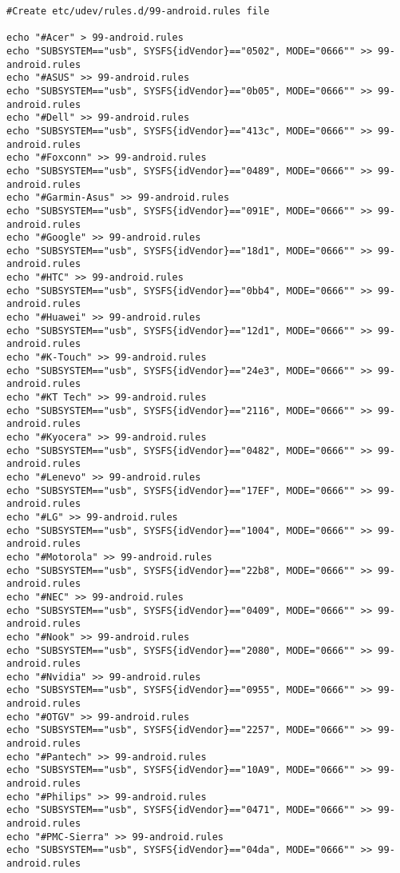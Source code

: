 \begin{maxipage}
\begin{verbatim}
#Create etc/udev/rules.d/99-android.rules file

echo "#Acer" > 99-android.rules
echo "SUBSYSTEM=="usb", SYSFS{idVendor}=="0502", MODE="0666"" >> 99-android.rules
echo "#ASUS" >> 99-android.rules
echo "SUBSYSTEM=="usb", SYSFS{idVendor}=="0b05", MODE="0666"" >> 99-android.rules
echo "#Dell" >> 99-android.rules
echo "SUBSYSTEM=="usb", SYSFS{idVendor}=="413c", MODE="0666"" >> 99-android.rules
echo "#Foxconn" >> 99-android.rules
echo "SUBSYSTEM=="usb", SYSFS{idVendor}=="0489", MODE="0666"" >> 99-android.rules
echo "#Garmin-Asus" >> 99-android.rules
echo "SUBSYSTEM=="usb", SYSFS{idVendor}=="091E", MODE="0666"" >> 99-android.rules
echo "#Google" >> 99-android.rules
echo "SUBSYSTEM=="usb", SYSFS{idVendor}=="18d1", MODE="0666"" >> 99-android.rules
echo "#HTC" >> 99-android.rules
echo "SUBSYSTEM=="usb", SYSFS{idVendor}=="0bb4", MODE="0666"" >> 99-android.rules
echo "#Huawei" >> 99-android.rules
echo "SUBSYSTEM=="usb", SYSFS{idVendor}=="12d1", MODE="0666"" >> 99-android.rules
echo "#K-Touch" >> 99-android.rules
echo "SUBSYSTEM=="usb", SYSFS{idVendor}=="24e3", MODE="0666"" >> 99-android.rules
echo "#KT Tech" >> 99-android.rules
echo "SUBSYSTEM=="usb", SYSFS{idVendor}=="2116", MODE="0666"" >> 99-android.rules
echo "#Kyocera" >> 99-android.rules
echo "SUBSYSTEM=="usb", SYSFS{idVendor}=="0482", MODE="0666"" >> 99-android.rules
echo "#Lenevo" >> 99-android.rules
echo "SUBSYSTEM=="usb", SYSFS{idVendor}=="17EF", MODE="0666"" >> 99-android.rules
echo "#LG" >> 99-android.rules
echo "SUBSYSTEM=="usb", SYSFS{idVendor}=="1004", MODE="0666"" >> 99-android.rules
echo "#Motorola" >> 99-android.rules
echo "SUBSYSTEM=="usb", SYSFS{idVendor}=="22b8", MODE="0666"" >> 99-android.rules
echo "#NEC" >> 99-android.rules
echo "SUBSYSTEM=="usb", SYSFS{idVendor}=="0409", MODE="0666"" >> 99-android.rules
echo "#Nook" >> 99-android.rules
echo "SUBSYSTEM=="usb", SYSFS{idVendor}=="2080", MODE="0666"" >> 99-android.rules
echo "#Nvidia" >> 99-android.rules
echo "SUBSYSTEM=="usb", SYSFS{idVendor}=="0955", MODE="0666"" >> 99-android.rules
echo "#OTGV" >> 99-android.rules
echo "SUBSYSTEM=="usb", SYSFS{idVendor}=="2257", MODE="0666"" >> 99-android.rules
echo "#Pantech" >> 99-android.rules
echo "SUBSYSTEM=="usb", SYSFS{idVendor}=="10A9", MODE="0666"" >> 99-android.rules
echo "#Philips" >> 99-android.rules
echo "SUBSYSTEM=="usb", SYSFS{idVendor}=="0471", MODE="0666"" >> 99-android.rules
echo "#PMC-Sierra" >> 99-android.rules
echo "SUBSYSTEM=="usb", SYSFS{idVendor}=="04da", MODE="0666"" >> 99-android.rules
\end{verbatim}
\end{maxipage}
